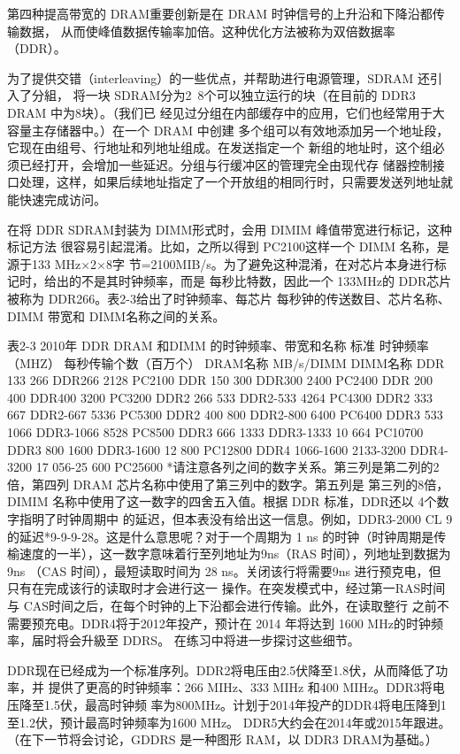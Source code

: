 第四种提高带宽的 DRAM重要创新是在 DRAM 时钟信号的上升沿和下降沿都传输数据，
从而使峰值数据传输率加倍。这种优化方法被称为双倍数据率（DDR）。

为了提供交错（interleaving）的一些优点，并帮助进行电源管理，SDRAM 还引入了分組，
将一块 SDRAM分为2~8个可以独立运行的块（在目前的 DDR3 DRAM 中为8块）。（我们已
经见过分组在内部缓存中的应用，它们也经常用于大容量主存储器中。）在一个 DRAM 中创建
多个组可以有效地添加另一个地址段，它现在由组号、行地址和列地址组成。在发送指定一个
新组的地址时，这个组必须已经打开，会增加一些延迟。分组与行缓冲区的管理完全由现代存
储器控制接口处理，这样，如果后续地址指定了一个开放组的相同行时，只需要发送列地址就
能快速完成访问。

在将 DDR SDRAM封装为 DIMM形式时，会用 DIMIM 峰值带宽进行标记，这种标记方法
很容易引起混淆。比如，之所以得到 PC2100这样一个 DIMM 名称，是源于133 MHz×2×8字
节=2100MIB/s。为了避免这种混淆，在对芯片本身进行标记时，给出的不是其时钟频率，而是
每秒比特数，因此一个 133MHz的 DDR芯片被称为 DDR266。表2-3给出了时钟频率、每芯片
每秒钟的传送数目、芯片名称、DIMM 带宽和 DIMM名称之间的关系。

表2-3
2010年 DDR DRAM 和DIMM 的时钟频率、带宽和名称
标准 时钟频率（MHZ）
每秒传输个数（百万个）
DRAM名称
MB/s/DIMM
DIMM名称
DDR
133
266
DDR266
2128
PC2100
DDR
150
300
DDR300
2400
PC2400
DDR
200
400
DDR400
3200
PC3200
DDR2
266
533
DDR2-533
4264
PC4300
DDR2
333
667
DDR2-667
5336
PC5300
DDR2
400
800
DDR2-800
6400
PC6400
DDR3
533
1066
DDR3-1066
8528
PC8500
DDR3
666
1333
DDR3-1333
10 664
PC10700
DDR3
800
1600
DDR3-1600
12 800
PC12800
DDR4
1066-1600
2133-3200
DDR4-3200
17 056-25 600
PC25600
*请注意各列之间的数字关系。第三列是第二列的2倍，第四列 DRAM 芯片名称中使用了第三列中的数字。第五列是
第三列的8倍，DIMIM 名称中使用了这一数字的四舍五入值。根据 DDR 标准，DDR还以 4个数字指明了时钟周期中
的延迟，但本表没有给出这一信息。例如，DDR3-2000 CL 9的延迟*9-9-9-28。这是什么意思呢？对于一个周期为
1 ns 的时钟（时钟周期是传榆速度的一半），这一数字意味着行至列地址为9ns（RAS 时间），列地址到数据为9ns
（CAS 时间），最短读取时间为 28 ns。关闭该行将需要9ns 进行预克电，但只有在完成该行的读取时才会进行这一
操作。在突发模式中，经过第一RAS时间与 CAS时间之后，在每个时钟的上下沿都会进行传输。此外，在读取整行
之前不需要预充电。DDR4将于2012年投产，预计在 2014 年将达到 1600 MHz的时钟频率，届时将会升級至 DDRS。
在练习中将进一步探讨这些细节。

DDR现在已经成为一个标准序列。DDR2将电压由2.5伏降至1.8伏，从而降低了功率，并
提供了更高的时钟频率：266 MIHz、333 MIHz 和400 MIHz。DDR3将电压降至1.5伏，最高时钟频
率为800MHz。计划于2014年投产的DDR4将电压降到1至1.2伏，预计最高时钟频率为1600 MHz。
DDR5大约会在2014年或2015年跟进。（在下一节将会讨论，GDDRS 是一种图形 RAM，以
DDR3 DRAM为基础。）

